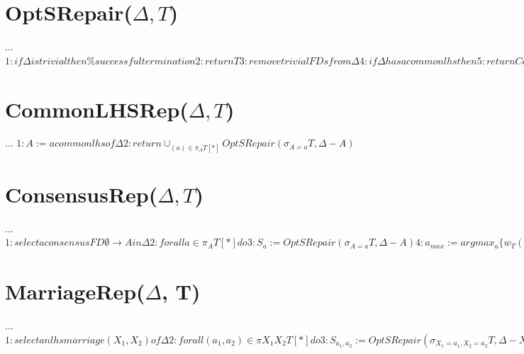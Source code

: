 \documentclass[12pt, a4paper, oneside, titlepage]{book}%
\makeatletter
\def\BState{\State\hskip-\ALG@thistlm}
\makeatother
\begin{document}
\begin{algorithm}
\caption{OSRSucceeds}\label{euclid}
\end{algorithm}


\clearpage
\section{OptSRepair($\Delta, T$)}
...
$
1: if \Delta is trivial then \% successful termination
2: return T
3: remove trivial FDs from \Delta
4: if \Delta has a common lhs then
5: return CommonLHSRep(\Delta,T )
6: if \Delta has a consensus FD then
7: return ConsensusRep(\Delta,T )
8: if \Delta has an lhs marriage then
9: return MarriageRep(\Delta,T )
10: fail \% cannot find an optimal S-repair
$

\section{CommonLHSRep($\Delta, T$)}
...
$
1: A := a common lhs of \Delta
2: return \cup_{(a)\in \pi_{A}T[*]}OptSRepair(\sigma_{A=a}T, \Delta - A)
$

\section{ConsensusRep($\Delta, T$)}
...
$
1: select a consensus FD \emptyset \rightarrow  A in \Delta
2: for all a \in \pi_A T [*] do
3: S_a := OptSRepair(\sigma_{A=a}T, \Delta - A)
4: a_{max} := argmax_a \{w_T (S_a ) | (a) \in  \sigma_A T [*]\}
5: return S_{a_{max}}
$

\section{MarriageRep($\Delta$, T)}
...
$
1: select an lhs marriage (X_1, X_2) of \Delta
2: for all (a_1, a_2) \in  \pi{X_1 X_2} T [*] do
3: S_{a_1, a_2} := OptSRepair(\sigma_{X_1 = a_1, X_2 = a_2}T, \Delta - X_1 X_2)
4: w(a_1, a_2) := w_T (S_{a_1,a_2} )
5: V_i := \pi_{X_i}T [*] for i = 1, 2
6: E := \{(a_1, a_2) | (a_1, a_2) \in  \pi_{X_1 X_2}T [*]\}
7: G := weighted bipartite graph (V_1,V_2, E,w)
8: E_{max} := a maximum matching of G
9: return \cup_{(a_1, a_2 )\in E_{max}}S_{a_1, a_2}
$
\end{document}
